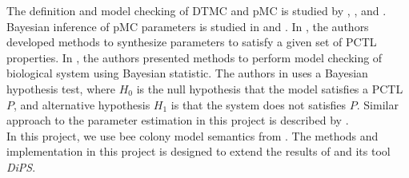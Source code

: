 The definition and model checking of DTMC and pMC is studied by
\cite{baier2008principles}, \cite{hutschenreiter2017parametric}, and \cite{katoen2016probabilistic}.\\
Bayesian inference of pMC parameters is studied in \cite{polgreen2016data} and
\cite{jha2009bayesian}. In \cite{polgreen2016data}, the authors developed
methods to synthesize parameters to satisfy a given set of PCTL properties. In
\cite{jha2009bayesian}, the authors presented methods to perform model checking
of biological system using Bayesian statistic. The authors in
\cite{jha2009bayesian} uses a Bayesian hypothesis test, where $H_0$ is the null
hypothesis that the model satisfies a PCTL $P$, and alternative hypothesis $H_1$
is that the system does not satisfies $P$. Similar approach to the parameter
estimation in this project is described by \cite{hussain2015automated}.\\
In this project, we use bee colony model semantics from \cite{hajnal2019data}.
The methods and implementation in this project is designed to extend the results
of \cite{hajnal2019data} and its tool \textit{DiPS}.